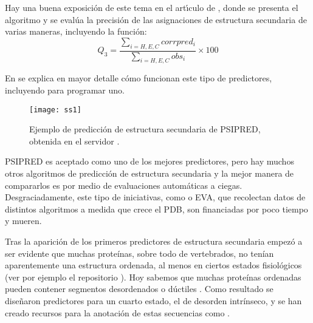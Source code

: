 Hay una buena exposici\'{o}n de este tema en el art\'\i{}culo de \cite{Jones1999}, 
donde se presenta el algoritmo 
y se eval\'{u}a la precisi\'{o}n de las asignaciones de estructura secundaria de varias maneras, incluyendo la funci\'{o}n:
\begin{equation}
Q_{3} = \frac{\sum\limits_{i=H,E,C}{corrpred_{i}}}{\sum\limits_{i=H,E,C}{obs_{i}}} \times 100
\end{equation}

En \citet{Jurtz2017} se explica en mayor detalle c\'{o}mo funcionan este tipo de predictores, 
incluyendo 
para programar uno.


\begin{figure}
\begin{center} 
\texttt{[image: ss1]}
\caption%
{
Ejemplo de predicci\'{o}n de estructura secundaria de PSIPRED, 
obtenida en el servidor .
}
\label{fig:psipred}
\end{center}
\end{figure}

PSIPRED es aceptado como uno de los mejores predictores, pero hay muchos otros algoritmos de predicci\'{o}n de estructura secundaria y 
la mejor manera de compararlos es por medio de evaluaciones autom\'{a}ticas a ciegas. Desgraciadamente, este tipo de iniciativas, como  
 o EVA,  
que recolectan datos de distintos algoritmos a medida que crece el PDB, son financiadas por poco tiempo y mueren.

Tras la aparici\'{o}n de los primeros predictores de estructura secundaria empez\'{o} a ser evidente que muchas prote\'{i}nas, 
sobre todo de vertebrados, no ten\'{i}an aparentemente una estructura ordenada, al menos en ciertos estados fisiol\'{o}gicos 
(ver por ejemplo el repositorio  \citep{Sickmeier2007,yruela_inmaculada_2014_1066352}).
Hoy sabemos que muchas prote\'{i}nas ordenadas pueden contener segmentos desordenados o d\'{u}ctiles \citep{Lobanov2010}.
Como resultado se dise\~naron predictores para un cuarto estado, el de desorden intr\'{i}nseco, y se han creado recursos para la 
anotaci\'{o}n de estas secuencias como .

